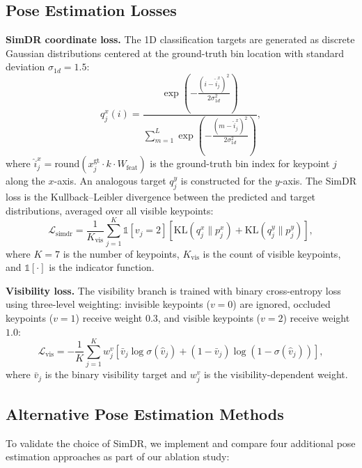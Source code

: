 \subsection{Pose Estimation Losses}
\label{subsec:pose_losses}

\textbf{SimDR coordinate loss.} The 1D classification targets are generated as discrete Gaussian distributions centered at the ground-truth bin location with standard deviation $\sigma_{1d} = 1.5$:
\begin{equation}
    q^x_j(i) = \frac{\exp\left(-\frac{(i - \hat{i}^x_j)^2}{2\sigma_{1d}^2}\right)}{\sum_{m=1}^{L} \exp\left(-\frac{(m - \hat{i}^x_j)^2}{2\sigma_{1d}^2}\right)},
    \label{eq:simdr_target}
\end{equation}
where $\hat{i}^x_j = \text{round}(x_j^\text{gt} \cdot k \cdot W_\text{feat})$ is the ground-truth bin index for keypoint $j$ along the $x$-axis. An analogous target $q^y_j$ is constructed for the $y$-axis. The SimDR loss is the Kullback--Leibler divergence between the predicted and target distributions, averaged over all visible keypoints:
\begin{equation}
    \mathcal{L}_\text{simdr} = \frac{1}{K_\text{vis}} \sum_{j=1}^{K} \mathbb{1}[v_j = 2] \left[ \text{KL}(q^x_j \| p^x_j) + \text{KL}(q^y_j \| p^y_j) \right],
    \label{eq:kl_loss}
\end{equation}
where $K = 7$ is the number of keypoints, $K_\text{vis}$ is the count of visible keypoints, and $\mathbb{1}[\cdot]$ is the indicator function.

\textbf{Visibility loss.} The visibility branch is trained with binary cross-entropy loss using three-level weighting: invisible keypoints ($v = 0$) are ignored, occluded keypoints ($v = 1$) receive weight $0.3$, and visible keypoints ($v = 2$) receive weight $1.0$:
\begin{equation}
    \mathcal{L}_\text{vis} = -\frac{1}{K} \sum_{j=1}^{K} w_j^v \left[ \bar{v}_j \log \sigma(\hat{v}_j) + (1 - \bar{v}_j) \log (1 - \sigma(\hat{v}_j)) \right],
    \label{eq:vis_loss}
\end{equation}
where $\bar{v}_j$ is the binary visibility target and $w_j^v$ is the visibility-dependent weight.

\subsection{Alternative Pose Estimation Methods}
\label{subsec:pose_alternatives}

To validate the choice of SimDR, we implement and compare four additional pose estimation approaches as part of our ablation study:


